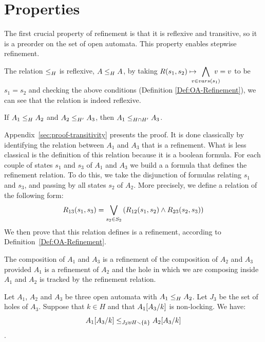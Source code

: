 \documentclass[runningheads]{llncs}
\begin{document}
\section{Properties}\label{sec:prop}


The first crucial property of  refinement  is that it is reflexive  and  transitive,  so  it  is  a  preorder on the set of open automata. This property enables stepwise refinement.


The relation  \(\wrel{}{}{H}\) is reflexive,  \(\wrel{A}{A}{H}\),  by taking $R\mpar{s_1, s_2} \mapsto \displaystyle\bigwedge_\subbox{v \in vars(s_1)} {v=v}$ to be $s_1= s_2$  and checking the above conditions (Definition \ref{Def:OA-Refinement}), we can see that the relation is indeed reflexive.


\begin{theorem}[Transitivity]
If $\wrel{A_1}{A_2}{H}$ and $\wrel{A_2}{A_3}{H'}$, then $\wrel{A_1}{A_3}{H\cap H'}$.
\end{theorem}

Appendix~\ref{sec:proof-transitivity} presents the proof. It is done classically by identifying the relation between $A_1$ and $A_3$ that is a refinement. What is less classical is the definition of this relation because it is a boolean formula. For each couple of states  $s_1$ and $s_3$ of $A_1$ and $A_3$ we build a a formula that defines the refinement relation. To do this, we take the disjunction of formulas relating $s_1$ and $s_3$, and passing by all states $s_2$ of $A_2$. More precisely, we define a relation of the following form:
  \[R_{13}(s_1,s_3)=\bigvee_{s_2\in S_2}\mpar{R_{12}(s_1,s_2) \land R_{23}(s_2,s_3) } \]
We then prove that this relation defines is a refinement, according to Definition~\ref{Def:OA-Refinement}.




The composition of $A_1$ and $A_3$ is a refinement of the composition of $A_2$ and $A_3$ provided $A_1$ is a refinement of $A_2$ and the hole in which we are composing inside $A_1$ and $A_2$ is tracked by the refinement relation.

\begin{theorem}
Let $A_1$, $A_2$ and $A_3$ be three open automata with $\wrel{A_1}{A_2}{H}$. 
Let $J_3$ be the set of holes of $A_3$.
Suppose that \(k \in H\) and that \(A_1\subst{A_3}{k}\) is non-locking.
We have: \[\wrel{A_1\subst{A_3}{k}}{A_2\subst{A_3}{k}}{J_3 \uplus H \setminus \mbrc{k}}\].
\end{theorem}
\end{document}

